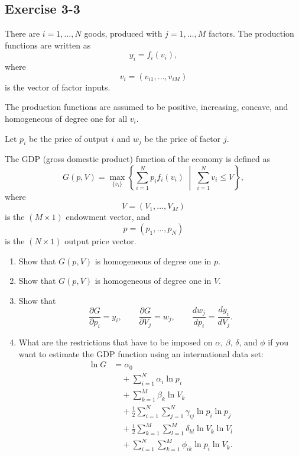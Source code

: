 \vspace{30pt}
\begin{tcolorbox}[breakable]

\subsection*{Exercise 3-3}

There are \(i = 1, \dots, N\) goods, produced with \(j = 1, \dots, M\) factors.  
The production functions are written as
\[
y_i = f_i(v_i),
\]
where
\[
v_i = (v_{i1}, \dots, v_{iM})
\]
is the vector of factor inputs.

The production functions are assumed to be positive, increasing, concave, and homogeneous of degree one for all \(v_i\).

Let \(p_i\) be the price of output \(i\) and \(w_j\) be the price of factor \(j\).

The GDP (gross domestic product) function of the economy is defined as
\[
G(p, V) = \max_{\{v_i\}} \left\{ \sum_{i=1}^N p_i f_i(v_i) \;\middle|\; \sum_{i=1}^N v_i \leq V \right\},
\]
where
\[
V = (V_1, \dots, V_M)
\]
is the \((M \times 1)\) endowment vector, and
\[
p = (p_1, \dots, p_N)
\]
is the \((N \times 1)\) output price vector.

\begin{enumerate}
\item[(i)] Show that \(G(p, V)\) is homogeneous of degree one in \(p\).

\item[(ii)] Show that \(G(p, V)\) is homogeneous of degree one in \(V\).

\item[(iii)] Show that
\[
\frac{\partial G}{\partial p_i} = y_i,
\qquad
\frac{\partial G}{\partial V_j} = w_j,
\qquad
\frac{d w_j}{d p_i} = \frac{d y_i}{d V_j}.
\]

\item[(iv)] What are the restrictions that have to be imposed on \(\alpha\), \(\beta\), \(\delta\), and \(\phi\) if you want to estimate the GDP function using an international data set:
\[
\begin{aligned}
\ln G &= \alpha_0 \\
&\quad + \sum_{i=1}^N \alpha_i \ln p_i \\
&\quad + \sum_{k=1}^M \beta_k \ln V_k \\
&\quad + \frac{1}{2} \sum_{i=1}^N \sum_{j=1}^N \gamma_{ij} \ln p_i \ln p_j \\
&\quad + \frac{1}{2} \sum_{k=1}^M \sum_{l=1}^M \delta_{kl} \ln V_k \ln V_l \\
&\quad + \sum_{i=1}^N \sum_{k=1}^M \phi_{ik} \ln p_i \ln V_k.
\end{aligned}
\]


\end{enumerate}
\end{tcolorbox}
